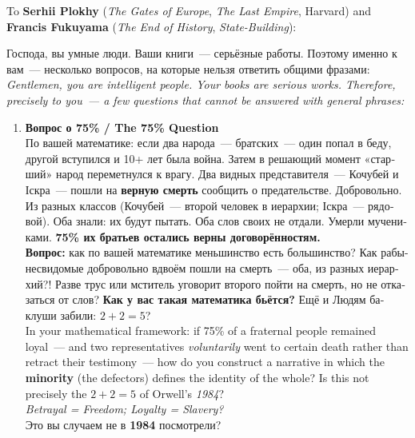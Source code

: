 \documentclass[11pt,a4paper]{article}
\theoremstyle{definition}
\theoremstyle{remark}
\begin{document}
\begin{londonbox}

\noindent To \textbf{Serhii Plokhy} (\textit{The Gates of Europe},
\textit{The Last Empire}, Harvard) and
\textbf{Francis Fukuyama} (\textit{The End of History},
\textit{State-Building}):

\vspace{0.3cm}
\foreignlanguage{russian}{
Господа, вы умные люди. Ваши книги~--- серьёзные работы.
Поэтому именно к вам~--- несколько вопросов, на которые нельзя
ответить общими фразами:
}\\[0.2cm]
\textit{Gentlemen, you are intelligent people.
Your books are serious works.
Therefore, precisely to you~--- a few questions that cannot be
answered with general phrases:}

\vspace{0.3cm}
\begin{enumerate}[leftmargin=1.5cm, itemsep=8pt]

  \item \textbf{\foreignlanguage{russian}{Вопрос о 75\% / The 75\% Question}}\\
    \foreignlanguage{russian}{
    По вашей математике: если два народа~--- братских~--- один попал в беду,
    другой вступился и 10+ лет была война.
    Затем в решающий момент «старший» народ переметнулся к врагу.
    Два видных представителя~--- Кочубей и Іскра~---
    пошли на \textbf{верную смерть} сообщить о предательстве.
    Добровольно. Из разных классов
    (Кочубей~--- второй человек в иерархии; Іскра~--- рядовой).
    Оба знали: их будут пытать. Оба слов своих не отдали.
    Умерли мучениками.
    \textbf{75\% их братьев остались верны договорённостям.}\\[0.2cm]
    \textbf{Вопрос:} как по вашей математике меньшинство есть большинство?
    Как рабы-несвидомые добровольно вдвоём пошли на смерть~---
    оба, из разных иерархий?!
    Разве трус или мститель уговорит второго пойти на смерть,
    но не отказаться от слов?
    \textbf{Как у вас такая математика бьётся?}
    Ещё и Людям баклуши забили: $2+2=5$?
    }\\[0.2cm]
    In your mathematical framework: if 75\% of a fraternal people
    remained loyal~--- and two representatives \textit{voluntarily}
    went to certain death rather than retract their testimony~---
    how do you construct a narrative in which the \textbf{minority}
    (the defectors) defines the identity of the whole?
    Is this not precisely the $2+2=5$ of Orwell's
    \textit{1984}?\\[0.2cm]
    \textit{Betrayal = Freedom; Loyalty = Slavery?}\\
    \foreignlanguage{russian}{Это вы случаем не в \textbf{1984} посмотрели?}


\end{enumerate}
\end{londonbox}
\end{document}
